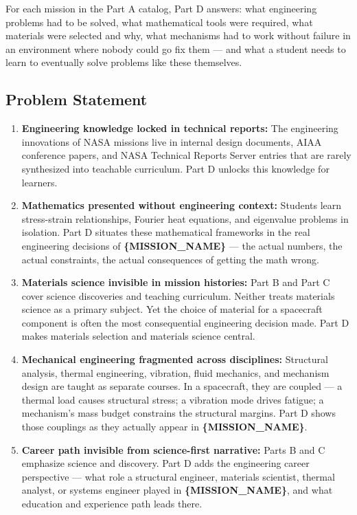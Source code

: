 \documentclass[11pt,letterpaper]{article}
\newcommand{\param}[1]{\textcolor{paramred}{\textbf{\{#1\}}}}
\begin{document}
For each mission in the Part A catalog, Part D answers: what engineering problems had to be solved, what mathematical tools were required, what materials were selected and why, what mechanisms had to work without failure in an environment where nobody could go fix them --- and what a student needs to learn to eventually solve problems like these themselves.

\subsection{Problem Statement}

\begin{enumerate}[leftmargin=*, label=\textbf{P\arabic*.}]
  \item \textbf{Engineering knowledge locked in technical reports:} The engineering innovations of NASA missions live in internal design documents, AIAA conference papers, and NASA Technical Reports Server entries that are rarely synthesized into teachable curriculum. Part D unlocks this knowledge for learners.
  \item \textbf{Mathematics presented without engineering context:} Students learn stress-strain relationships, Fourier heat equations, and eigenvalue problems in isolation. Part D situates these mathematical frameworks in the real engineering decisions of \param{MISSION\_NAME} --- the actual numbers, the actual constraints, the actual consequences of getting the math wrong.
  \item \textbf{Materials science invisible in mission histories:} Part B and Part C cover science discoveries and teaching curriculum. Neither treats materials science as a primary subject. Yet the choice of material for a spacecraft component is often the most consequential engineering decision made. Part D makes materials selection and materials science central.
  \item \textbf{Mechanical engineering fragmented across disciplines:} Structural analysis, thermal engineering, vibration, fluid mechanics, and mechanism design are taught as separate courses. In a spacecraft, they are coupled --- a thermal load causes structural stress; a vibration mode drives fatigue; a mechanism's mass budget constrains the structural margins. Part D shows those couplings as they actually appear in \param{MISSION\_NAME}.
  \item \textbf{Career path invisible from science-first narrative:} Parts B and C emphasize science and discovery. Part D adds the engineering career perspective --- what role a structural engineer, materials scientist, thermal analyst, or systems engineer played in \param{MISSION\_NAME}, and what education and experience path leads there.
\end{enumerate}
\end{document}
